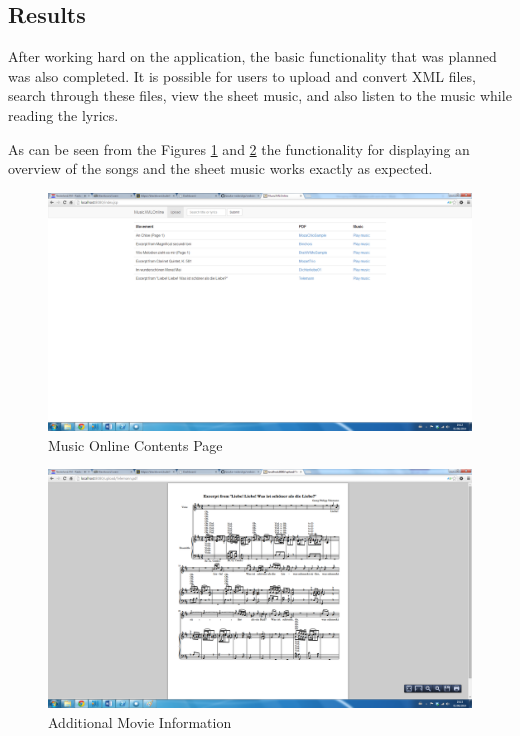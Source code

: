 \documentclass[MusicXML.tex]{subfiles}
\begin{document}
\subsection{Results}
After working hard on the application, the basic functionality that was planned was also completed. It is possible for users to upload and convert XML files, search through these files, view the sheet music, and also listen to the music while reading the lyrics. 

As can be seen from the Figures \ref{fig:musicindex} and \ref{fig:musicpdf} the functionality for displaying an overview of the songs and the sheet music works exactly as expected. 

\begin{figure} [H]
	\centering
	\includegraphics[width=1\textwidth]{./Figures/MusicXMLOnline-index.png}
	\caption{Music Online Contents Page}
	\label{fig:musicindex}
\end{figure}

\begin{figure} [H]
	\centering
	\includegraphics[width=1\textwidth]{./Figures/MusicXMLOnline-pdf.png}
	\caption{Additional Movie Information}
	\label{fig:musicpdf}
\end{figure}
\end{document}
